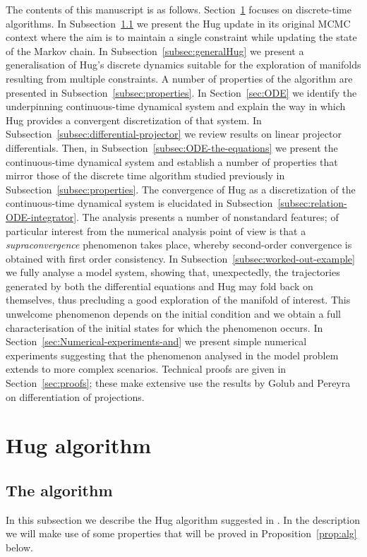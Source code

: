 \documentclass[10pt]{article}
\begin{document}
The contents of this manuscript is as follows. Section~\ref{sec:Hug} focuses on discrete-time algorithms. In Subsection~\ref{subsec:originalHug} we
present the Hug update in its original MCMC context where the aim
is to maintain a single constraint while updating the state of the Markov chain.
In Subsection~\ref{subsec:generalHug} we present a generalisation of Hug's discrete
dynamics \cite{C24} suitable for the exploration of manifolds resulting from
multiple constraints.  A number of properties of the algorithm are presented in Subsection~\ref{subsec:properties}. In Section~\ref{sec:ODE}
we identify the underpinning continuous-time dynamical system and
explain the  way in which Hug provides a convergent discretization of that system. In Subsection~\ref{subsec:differential-projector}
we review results on linear projector differentials. Then, in Subsection~\ref{subsec:ODE-the-equations} we present the continuous-time dynamical system  and establish a number of properties that mirror those of the discrete time algorithm studied previously in Subsection~\ref{subsec:properties}.
The convergence of
Hug as a discretization of the continuous-time dynamical system is elucidated in Subsection~\ref{subsec:relation-ODE-integrator}. The analysis presents a number of nonstandard features; of particular interest from the numerical analysis point of view is that a  \emph{supraconvergence} phenomenon \cite{GS91} takes place, whereby second-order convergence is obtained with first order consistency.
In Subsection~\ref{subsec:worked-out-example} we fully analyse a model system, showing that, unexpectedly, the trajectories generated by both the differential equations and Hug may fold back on themselves, thus precluding a good exploration of the manifold of interest. This unwelcome phenomenon depends on the initial condition and we obtain
a full characterisation of the initial states for which the phenomenon occurs. In Section~\ref{sec:Numerical-experiments-and} we present simple numerical experiments
suggesting that the phenomenon analysed in the model problem extends to more complex scenarios.
Technical proofs are given in Section~\ref{sec:proofs}; these make extensive use the results  by Golub and Pereyra \cite{GP} on differentiation of projections.


\section{Hug algorithm} \label{sec:Hug}
\subsection{The algorithm} \label{subsec:originalHug}
In this subsection we describe the Hug algorithm suggested in \cite{LS23}. In the description we will make use of some properties that will be proved in Proposition~\ref{prop:alg} below.
\end{document}
